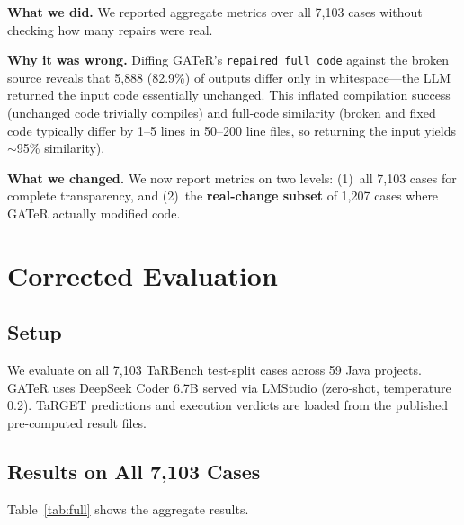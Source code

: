 \documentclass[conference,10pt]{IEEEtran}
\begin{document}
\textbf{What we did.}  We reported aggregate metrics over all 7{,}103
cases without checking how many repairs were real.

\textbf{Why it was wrong.}  Diffing GATeR's \texttt{repaired\_full\_code}
against the broken source reveals that 5{,}888 (82.9\%) of outputs
differ only in whitespace---the LLM returned the input code essentially
unchanged.  This inflated compilation success (unchanged code trivially
compiles) and full-code similarity (broken and fixed code typically
differ by 1--5 lines in 50--200 line files, so returning the input
yields $\sim$95\% similarity).

\textbf{What we changed.}  We now report metrics on two levels:
(1)~all 7{,}103 cases for complete transparency, and (2)~the
\textbf{real-change subset} of 1{,}207 cases where GATeR actually
modified code.

\section{Corrected Evaluation}
\label{sec:eval}

\subsection{Setup}

We evaluate on all 7{,}103 TaRBench test-split cases across 59 Java
projects.  GATeR uses DeepSeek Coder 6.7B served via LMStudio (zero-shot,
temperature 0.2).  TaRGET predictions and execution verdicts are loaded
from the published pre-computed result files.

\subsection{Results on All 7{,}103 Cases}

Table~\ref{tab:full} shows the aggregate results.
\end{document}
